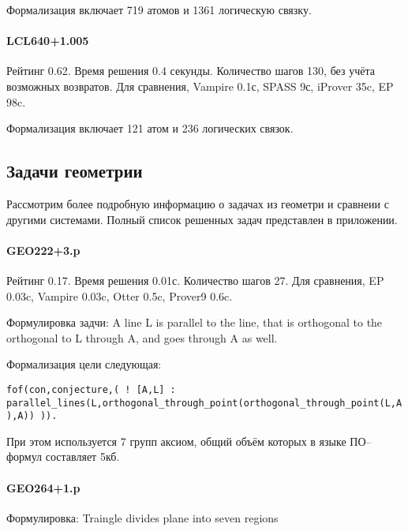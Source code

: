 Формализация включает 719 атомов и 1361 логическую связку.   


\paragraph{LCL640+1.005}
Рейтинг 0.62. Время решения 0.4 секунды. Количество шагов 130, без учёта возможных возвратов. Для сравнения, Vampire 0.1с, SPASS 9с, iProver 35c, EP 98c.

Формализация включает 121 атом и 236 логических связок.


\subsection{Задачи геометрии}
Рассмотрим более подробную информацию о задачах из геометри и сравнеии с другими системами. Полный список решенных задач представлен в приложении.

\paragraph{GEO222+3.p}
Рейтинг 0.17. Время решения 0.01с. Количество шагов 27. Для сравнения, EP 0.03c, Vampire 0.03c, Otter 0.5c, Prover9 0.6c.

Формулировка задчи: A line L is parallel to the line, that is orthogonal to the orthogonal to L through A, and goes through A as well.

Формализация цели следующая:

\texttt{fof(con,conjecture,(
    ! [A,L] : parallel\_lines(L,orthogonal\_through\_point(orthogonal\_through\_point(L,A),A)) )).}

При этом используется 7 групп аксиом, общий объём которых в языке ПО--формул составляет 5кб.

\paragraph{GEO264+1.p}

Формулировка: Traingle divides plane into seven regions

